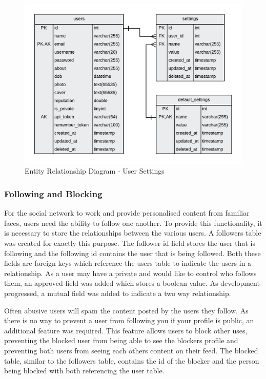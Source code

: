\begin{figure}[H]
  \centering
  \includegraphics[width=1.0\textwidth]{Images/Design/Database/Settings}
  \caption{Entity Relationship Diagram - User Settings} \label{fig:ERD_Settings}
\end{figure}

\subsubsection{Following and Blocking}

For the social network to work and provide personalised content from familiar faces, users need the ability to follow one another. To provide this functionality, it is necessary to store the relationships between the various users. A followers table was created for exactly this purpose. The follower id field stores the user that is following and the following id contains the user that is being followed. Both these fields are foreign keys which reference the users table to indicate the users in a relationship. As a user may have a private and would like to control who follows them, an approved field was added which stores a boolean value. As development progressed, a mutual field was added to indicate a two way relationship.

Often abusive users will spam the content posted by the users they follow. As there is no way to prevent a user from following you if your profile is public, an additional feature was required. This feature allows users to block other uses, preventing the blocked user from being able to see the blockers profile and preventing both users from seeing each others content on their feed. The blocked table, similar to the followers table, contains the id of the blocker and the person being blocked with both referencing the user table.

